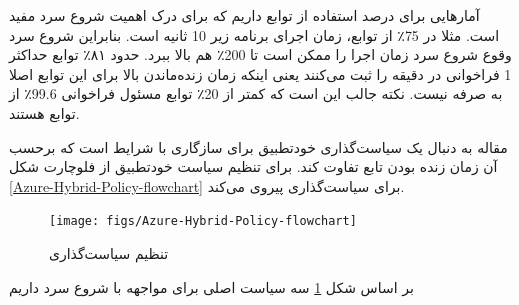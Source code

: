 آمارهایی برای درصد استفاده از توابع داریم که برای درک اهمیت شروع سرد مفید است. مثلا در 75٪ از توابع، زمان اجرای برنامه زیر 10 ثانیه است. بنابراین شروع سرد وقوع شروع سرد زمان اجرا را ممکن است تا 200٪ هم بالا ببرد. حدود ۸۱٪ توابع حداکثر 1 فراخوانی در دقیقه را ثبت می‌کنند یعنی اینکه زمان زنده‌ماندن بالا برای این توابع اصلا به صرفه نیست. نکته جالب این است که کمتر از 20٪ توابع مسئول فراخوانی 99.6٪ از توابع هستند. 

مقاله به دنبال یک سیاست‌گذاری خودتطبیق برای سازگاری با شرایط است که برحسب آن زمان زنده بودن تابع تفاوت کند. برای تنظیم سیاست خودتطبیق از فلوچارت شکل \ref{Azure-‌Hybrid-Policy-flowchart} برای سیاست‌گذاری پیروی می‌کند. 


\begin{figure}
	\centering
	\texttt{[image: figs/Azure-‌Hybrid-Policy-flowchart]}
	\caption {تنظیم سیاست‌گذاری}
	\label{fig:Azure-‌Hybrid-Policy-flowchart}
\end{figure}

بر اساس شکل \ref{fig:Azure-‌Hybrid-Policy-flowchart} سه سیاست اصلی برای مواجهه با شروع سرد داریم

